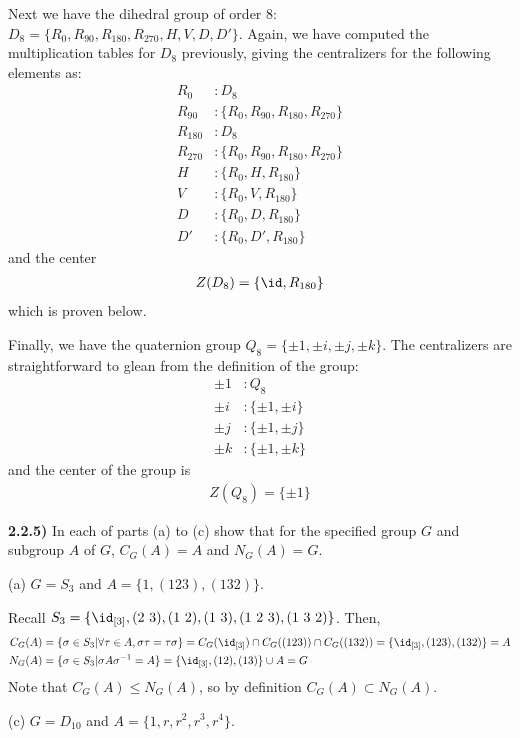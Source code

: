 \documentclass[12pt,a4paper]{article}
\newcommand{\prob}[2]{\textbf{#1)} #2}
\begin{document}
Next we have the dihedral group of order 8: $D_8 = \{R_{0},R_{90},R_{180},R_{270},H,V,D,D'\}$.
Again, we have computed the multiplication tables for $D_8$ previously, giving the centralizers for the following elements as:
\begin{align*}
R_{0}&: D_8 \\
R_{90}&: \{R_{0},R_{90},R_{180},R_{270}\} \\ 
R_{180}&: D_8 \\
R_{270}&: \{R_{0},R_{90},R_{180},R_{270}\} \\
H&: \{R_{0},H,R_{180}\} \\
V&: \{R_{0},V,R_{180}\} \\
D&: \{R_{0},D,R_{180}\} \\
D'&: \{R_{0},D',R_{180}\}
\end{align*}
and the center
\begin{align*}
Z(D_8) = \{\id,R_{180}\}
\end{align*}
which is proven below.

Finally, we have the quaternion group $Q_8 = \{\pm 1, \pm i, \pm j, \pm k\}$. The centralizers are straightforward to glean from the definition of the group:
\begin{align*}
\pm 1&: Q_8 \\
\pm i&: \{\pm 1, \pm i\} \\
\pm j&: \{\pm 1, \pm j\} \\
\pm k&: \{\pm 1, \pm k\}
\end{align*}
and the center of the group is 
\begin{align*}
Z(Q_8) = \{\pm 1\}
\end{align*}

\prob{2.2.5}{In each of parts (a) to (c) show that for the specified group $G$ and subgroup $A$ of $G$, $C_{G}(A) = A$ and $N_G(A) = G$.}

(a) $G = S_3$ and $A = \{1,(123),(132)\}$.

Recall $S_3 = \{\id_{[3]},(2~3),(1~2),(1~3),(1~2~3),(1~3~2)\}$. Then, 
\begin{align*}
C_{G}(A) &= \{\sigma \in S_3 | \forall \tau \in A, \sigma\tau = \tau\sigma \} = C_G(\id_{[3]}) \cap C_G((123)) \cap C_G((132)) = \{\id_{[3]},(123),(132)\} = A \\
N_{G}(A) &= \{\sigma \in S_3 | \sigma A \sigma^{-1} = A\} = \{\id_{[3]},(12),(13)\} \cup A = G
\end{align*}
Note that $C_{G}(A) \leq N_G(A)$, so by definition $C_G(A) \subset N_G(A)$.

(c) $G = D_{10}$ and $A = \{1,r,r^2,r^3,r^4\}$.
\end{document}
